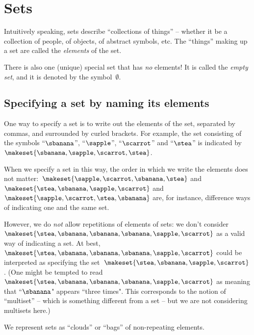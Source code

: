 
\section{Sets}

Intuitively speaking, sets describe ``collections of things'' -- whether it be a collection of people, of objects, of abstract symbols, etc.
The ``things'' making up a set are called the \emph{elements} of the set.

There is also one (unique) special set that has \emph{no} elements!
It is called the \emph{empty set}, and it is denoted by the symbol~$\emptyset$.

\subsection{Specifying a set by naming its elements}

One way to specify a set is to write out the elements of the set, separated by commas, and surrounded by curled brackets.
For example, the set consisting of the symbols ``$\sbanana$'', ``$\sapple$'', ``$\scarrot$'' and ``$\stea$'' is indicated by~$\makeset{ \sbanana, \sapple, \scarrot, \stea}$.

When we specify a set in this way, the order in which we write the elements does not matter:~$\makeset{ \sapple, \scarrot, \sbanana, \stea}$ and~$\makeset{ \stea, \sbanana, \sapple, \scarrot}$ and~$\makeset{ \sapple, \scarrot, \stea, \sbanana}$ are, for instance, difference ways of indicating one and the same set.

However, we do \emph{not} allow repetitions of elements of sets: we don't consider~$\makeset{ \stea, \sbanana, \sbanana, \sbanana, \sapple, \scarrot }$ as a valid way of indicating a set.
At best,~$\makeset{ \stea, \sbanana, \sbanana, \sbanana, \sapple, \scarrot }$ could be interpreted as specifying the set~$\makeset{ \stea, \sbanana, \sapple, \scarrot }$.
(One might be tempted to read $\makeset{ \stea, \sbanana, \sbanana, \sbanana, \sapple, \scarrot }$ as meaning that ``$\sbanana$" appears ``three times".
This corresponds to the notion of ``multiset'' -- which is something different from a set -- but we are not considering multisets here.)

\begin{marginfigure}
    \centering
    \caption{We represent sets as ``clouds'' or ``bags'' of non-repeating elements.}
    \label{fig:set_as_clouds}
\end{marginfigure}

